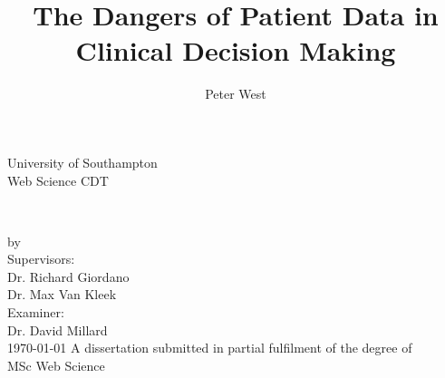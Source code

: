 \documentclass[a4paper]{scrartcl}     %
\title{The Dangers of Patient Data in Clinical Decision Making}
\author{Peter West}
\begin{document}
\begin{titlepage}
  \makeatletter
  \begin{center}
    {\LARGE University of Southampton}\\[0.5cm]
    {\Large Web Science CDT}\\[3.0cm]
    \begin{spacing}{2}
      {\huge \bfseries \@title} \\ [1.0cm]
    \end{spacing}
    {\Large by
       \@author \\[1.0cm]}
    {\Large
      Supervisors:\\[0.2cm]
      Dr. Richard Giordano\\[0.1cm]
      Dr. Max Van Kleek \\[0.7cm]
      Examiner:\\[0.2cm]
      Dr. David Millard\\[3.5cm]
    }
    {\Large \today}
    \vfill
    {\Large A dissertation submitted in partial fulfilment of the degree of}\\[0.5cm]
    {\Large MSc Web Science}
  \end{center}
  \makeatother
\end{titlepage}
\end{document}
